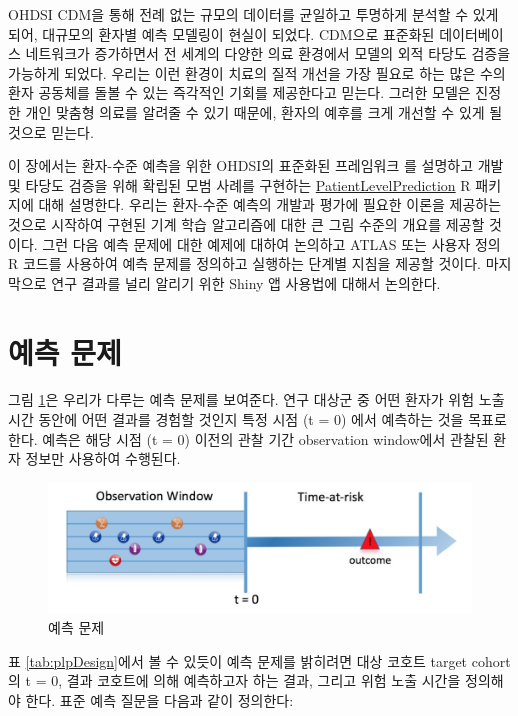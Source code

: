 \documentclass[10.5pt]{book}
\theoremstyle{definition}
\theoremstyle{definition}
\theoremstyle{definition}
\theoremstyle{remark}
\begin{document}
OHDSI CDM을 통해 전례 없는 규모의 데이터를 균일하고 투명하게 분석할 수
있게 되어, 대규모의 환자별 예측 모델링이 현실이 되었다. CDM으로 표준화된
데이터베이스 네트워크가 증가하면서 전 세계의 다양한 의료 환경에서 모델의
외적 타당도 검증을 가능하게 되었다. 우리는 이런 환경이 치료의 질적
개선을 가장 필요로 하는 많은 수의 환자 공동체를 돌볼 수 있는 즉각적인
기회를 제공한다고 믿는다. 그러한 모델은 진정한 개인 맞춤형 의료를 알려줄
수 있기 때문에, 환자의 예후를 크게 개선할 수 있게 될 것으로 믿는다.

이 장에서는 환자-수준 예측을 위한 OHDSI의 표준화된 프레임워크
\citep{reps2018} 를 설명하고 개발 및 타당도 검증을 위해 확립된 모범
사례를 구현하는
\href{https://ohdsi.github.io/PatientLevelPrediction/}{PatientLevelPrediction}
R 패키지에 대해 설명한다. 우리는 환자-수준 예측의 개발과 평가에 필요한
이론을 제공하는 것으로 시작하여 구현된 기계 학습 알고리즘에 대한 큰 그림
수준의 개요를 제공할 것이다. 그런 다음 예측 문제에 대한 예제에 대하여
논의하고 ATLAS 또는 사용자 정의 R 코드를 사용하여 예측 문제를 정의하고
실행하는 단계별 지침을 제공할 것이다. 마지막으로 연구 결과를 널리 알리기
위한 Shiny 앱 사용법에 대해서 논의한다.

\section{예측 문제}\label{-}

그림 \ref{fig:figure1}은 우리가 다루는 예측 문제를 보여준다. 연구 대상군
중 어떤 환자가 위험 노출 시간 동안에 어떤 결과를 경험할 것인지 특정 시점
(t = 0) 에서 예측하는 것을 목표로 한다. 예측은 해당 시점 (t = 0) 이전의
관찰 기간 observation window에서 관찰된 환자 정보만 사용하여 수행된다.

\begin{figure}

{\centering \includegraphics[width=1\linewidth]{images/PatientLevelPrediction/Figure1} 

}

\caption{예측 문제}\label{fig:figure1}
\end{figure}

표 \ref{tab:plpDesign}에서 볼 수 있듯이 예측 문제를 밝히려면 대상 코호트
target cohort의 t = 0, 결과 코호트에 의해 예측하고자 하는 결과, 그리고
위험 노출 시간을 정의해야 한다. 표준 예측 질문을 다음과 같이 정의한다:
  
\end{document}
